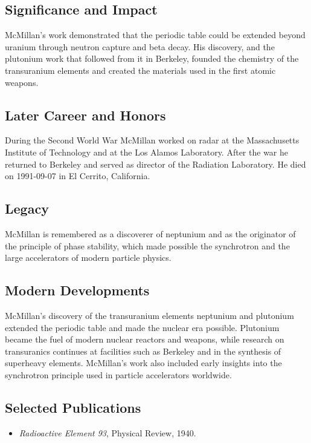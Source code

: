 \subsection*{Significance and Impact}

McMillan's work demonstrated that the periodic table could be extended beyond uranium through neutron capture and beta decay. His discovery, and the plutonium work that followed from it in Berkeley, founded the chemistry of the transuranium elements and created the materials used in the first atomic weapons.

\subsection*{Later Career and Honors}

During the Second World War McMillan worked on radar at the Massachusetts Institute of Technology and at the Los Alamos Laboratory. After the war he returned to Berkeley and served as director of the Radiation Laboratory. He died on 1991-09-07 in El Cerrito, California.

\subsection*{Legacy}

McMillan is remembered as a discoverer of neptunium and as the originator of the principle of phase stability, which made possible the synchrotron and the large accelerators of modern particle physics.

\subsection*{Modern Developments}

McMillan's discovery of the transuranium elements neptunium and plutonium extended the periodic table and made the nuclear era possible. Plutonium became the fuel of modern nuclear reactors and weapons, while research on transuranics continues at facilities such as Berkeley and in the synthesis of superheavy elements. McMillan's work also included early insights into the synchrotron principle used in particle accelerators worldwide.

\subsection*{Selected Publications}

\begin{itemize}

\item \emph{Radioactive Element 93}, Physical Review, 1940.

\end{itemize}

